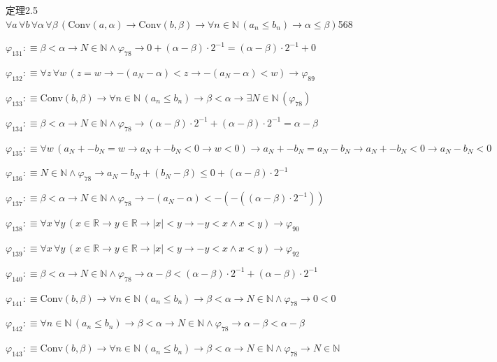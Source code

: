 \begin{fullproof}{定理2.5}{$\forall a\,\forall b\,\forall \alpha\,\forall \beta\,(\mathrm{Conv}(a,\alpha) \to \mathrm{Conv}(b,\beta) \to \forall n \in \mathbb{N}\,(a_{n} \leq b_{n}) \to \alpha \leq \beta)$}{568}
\begin{abbrevlist}
\item $\varphi_{131} :\equiv \beta < \alpha \to N \in \mathbb{N} \land \varphi_{78} \to 0 + (\alpha - \beta) \cdot 2^{-1} = (\alpha - \beta) \cdot 2^{-1} + 0$
\item $\varphi_{132} :\equiv \forall z\,\forall w\,(z = w \to -(a_{N} - \alpha) < z \to -(a_{N} - \alpha) < w) \to \varphi_{89}$
\item $\varphi_{133} :\equiv \mathrm{Conv}(b,\beta) \to \forall n \in \mathbb{N}\,(a_{n} \leq b_{n}) \to \beta < \alpha \to \exists N \in \mathbb{N}\,(\varphi_{78})$
\item $\varphi_{134} :\equiv \beta < \alpha \to N \in \mathbb{N} \land \varphi_{78} \to (\alpha - \beta) \cdot 2^{-1} + (\alpha - \beta) \cdot 2^{-1} = \alpha - \beta$
\item $\varphi_{135} :\equiv \forall w\,(a_{N} + -b_{N} = w \to a_{N} + -b_{N} < 0 \to w < 0) \to a_{N} + -b_{N} = a_{N} - b_{N} \to a_{N} + -b_{N} < 0 \to a_{N} - b_{N} < 0$
\item $\varphi_{136} :\equiv N \in \mathbb{N} \land \varphi_{78} \to a_{N} - b_{N} + (b_{N} - \beta) \leq 0 + (\alpha - \beta) \cdot 2^{-1}$
\item $\varphi_{137} :\equiv \beta < \alpha \to N \in \mathbb{N} \land \varphi_{78} \to -(a_{N} - \alpha) < -(-((\alpha - \beta) \cdot 2^{-1}))$
\item $\varphi_{138} :\equiv \forall x\,\forall y\,(x \in \mathbb{R} \to y \in \mathbb{R} \to \lvert x \rvert < y \to -y < x \land x < y) \to \varphi_{90}$
\item $\varphi_{139} :\equiv \forall x\,\forall y\,(x \in \mathbb{R} \to y \in \mathbb{R} \to \lvert x \rvert < y \to -y < x \land x < y) \to \varphi_{92}$
\item $\varphi_{140} :\equiv \beta < \alpha \to N \in \mathbb{N} \land \varphi_{78} \to \alpha - \beta < (\alpha - \beta) \cdot 2^{-1} + (\alpha - \beta) \cdot 2^{-1}$
\item $\varphi_{141} :\equiv \mathrm{Conv}(b,\beta) \to \forall n \in \mathbb{N}\,(a_{n} \leq b_{n}) \to \beta < \alpha \to N \in \mathbb{N} \land \varphi_{78} \to 0 < 0$
\item $\varphi_{142} :\equiv \forall n \in \mathbb{N}\,(a_{n} \leq b_{n}) \to \beta < \alpha \to N \in \mathbb{N} \land \varphi_{78} \to \alpha - \beta < \alpha - \beta$
\item $\varphi_{143} :\equiv \mathrm{Conv}(b,\beta) \to \forall n \in \mathbb{N}\,(a_{n} \leq b_{n}) \to \beta < \alpha \to N \in \mathbb{N} \land \varphi_{78} \to N \in \mathbb{N}$

\end{abbrevlist}
\end{fullproof}
